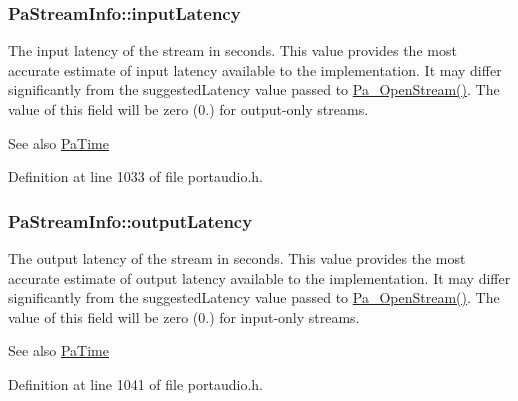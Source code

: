 \subsubsection[{\texorpdfstring{input\+Latency}{inputLatency}}]{ Pa\+Stream\+Info\+::input\+Latency}\hypertarget{struct_pa_stream_info_a1f5339e0fef75cea66d9153235698399}{}\label{struct_pa_stream_info_a1f5339e0fef75cea66d9153235698399}
The input latency of the stream in seconds. This value provides the most accurate estimate of input latency available to the implementation. It may differ significantly from the suggested\+Latency value passed to \hyperlink{portaudio_8h_a443ad16338191af364e3be988014cbbe}{Pa\+\_\+\+Open\+Stream()}. The value of this field will be zero (0.) for output-\/only streams. \begin{DoxySeeAlso}{See also}
\hyperlink{portaudio_8h_af17a7e6d0471a23071acf8dbd7bbe4bd}{Pa\+Time} 
\end{DoxySeeAlso}


Definition at line 1033 of file portaudio.\+h.

\subsubsection[{\texorpdfstring{output\+Latency}{outputLatency}}]{ Pa\+Stream\+Info\+::output\+Latency}\hypertarget{struct_pa_stream_info_a372a81f39d90a85ae62225e9f57a7840}{}\label{struct_pa_stream_info_a372a81f39d90a85ae62225e9f57a7840}
The output latency of the stream in seconds. This value provides the most accurate estimate of output latency available to the implementation. It may differ significantly from the suggested\+Latency value passed to \hyperlink{portaudio_8h_a443ad16338191af364e3be988014cbbe}{Pa\+\_\+\+Open\+Stream()}. The value of this field will be zero (0.) for input-\/only streams. \begin{DoxySeeAlso}{See also}
\hyperlink{portaudio_8h_af17a7e6d0471a23071acf8dbd7bbe4bd}{Pa\+Time} 
\end{DoxySeeAlso}


Definition at line 1041 of file portaudio.\+h.

